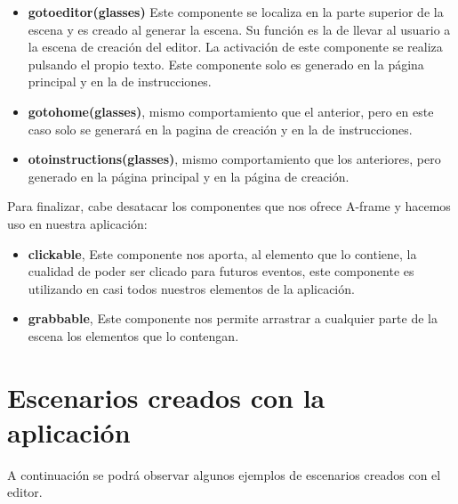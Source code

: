\documentclass[a4paper, 12pt]{book}
\begin{document}
\begin{itemize}
    \item \textbf{gotoeditor(glasses)} Este componente se localiza en la parte superior de la escena y es creado al generar la escena. Su función es la de llevar al usuario a la escena de creación del editor. La activación de este componente se realiza pulsando el propio texto. Este componente solo es generado en la página principal y en la de instrucciones.
    
    \item \textbf{gotohome(glasses)}, mismo comportamiento que el anterior, pero en este caso solo se generará en la pagina de creación y en la de instrucciones.
    
    \item \textbf{otoinstructions(glasses)}, mismo comportamiento que los anteriores, pero generado en la página principal y en la página de creación.
\end{itemize}

Para finalizar, cabe desatacar los componentes que nos ofrece A-frame y hacemos uso en nuestra aplicación:
\begin{itemize}
    \item \textbf{clickable}, Este componente nos aporta, al elemento que lo contiene, la cualidad de poder ser clicado para futuros eventos, este componente es utilizando en casi todos nuestros elementos de la aplicación.
    \item \textbf{grabbable}, Este componente nos permite arrastrar a cualquier parte de la escena los elementos que lo contengan. 
\end{itemize}

\section{Escenarios creados con la aplicación}
A continuación se podrá observar algunos ejemplos de escenarios creados con el editor.
\end{document}
